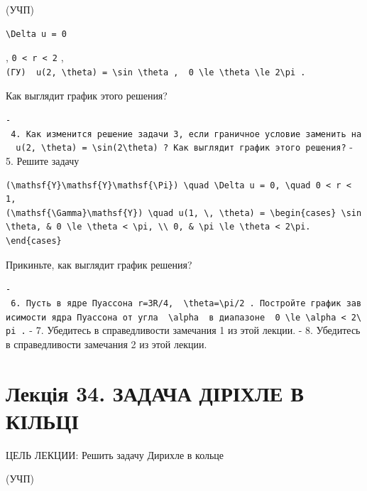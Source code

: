 \documentclass[
  ukrainian,
]{article}
\begin{document}
(УЧП)

\begin{verbatim}
\Delta u = 0
\end{verbatim}

, \texttt{0\ \textless{}\ r\ \textless{}\ 2} ,\\
\texttt{(ГУ)\ \ \textquotesingle{}u(2,\ \textbackslash{}theta)\ =\ \textbackslash{}sin\ \textbackslash{}theta\textquotesingle{}\ ,\ \ \textquotesingle{}0\ \textbackslash{}le\ \textbackslash{}theta\ \textbackslash{}le\ 2\textbackslash{}pi\textquotesingle{}\ .}

Как выглядит график этого решения?

\texttt{-\ 4.\ Как\ изменится\ решение\ задачи\ 3,\ если\ граничное\ условие\ заменить\ на\ \ \textquotesingle{}u(2,\ \textbackslash{}theta)\ =\ \textbackslash{}sin(2\textbackslash{}theta)\textquotesingle{}\ ?\ Как\ выглядит\ график\ этого\ решения?}
- 5. Решите задачу

\begin{verbatim}
(\mathsf{Y}\mathsf{Y}\mathsf{\Pi}) \quad \Delta u = 0, \quad 0 < r < 1,
(\mathsf{\Gamma}\mathsf{Y}) \quad u(1, \, \theta) = \begin{cases} \sin \theta, & 0 \le \theta < \pi, \\ 0, & \pi \le \theta < 2\pi. \end{cases}
\end{verbatim}

Прикиньте, как выглядит график решения?

\texttt{-\ 6.\ Пусть\ в\ ядре\ Пуассона\ r=3R/4,\ \ \textquotesingle{}\textbackslash{}theta=\textbackslash{}pi/2\textquotesingle{}\ .\ Постройте\ график\ зависимости\ ядра\ Пуассона\ от\ угла\ \ \textquotesingle{}\textbackslash{}alpha\textquotesingle{}\ \ в\ диапазоне\ \ \textquotesingle{}0\ \textbackslash{}le\ \textbackslash{}alpha\ \textless{}\ 2\textbackslash{}pi\textquotesingle{}\ .}
- 7. Убедитесь в справедливости замечания 1 из этой лекции. - 8.
Убедитесь в справедливости замечания 2 из этой лекции.

\section{Лекція 34. ЗАДАЧА ДІРІХЛЕ В
КІЛЬЦІ}\label{ux43bux435ux43aux446ux456ux44f-34.-ux437ux430ux434ux430ux447ux430-ux434ux456ux440ux456ux445ux43bux435-ux432-ux43aux456ux43bux44cux446ux456}

ЦЕЛЬ ЛЕКЦИИ: Решить задачу Дирихле в кольце

(УЧП)
\end{document}
